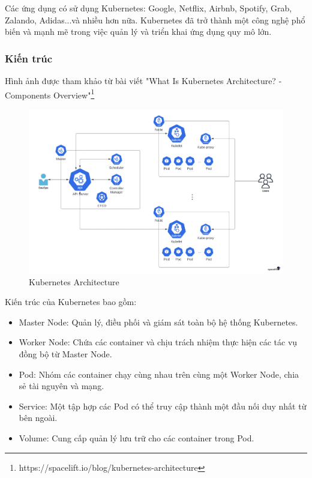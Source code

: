 \noindent Các ứng dụng có sử dụng Kubernetes: Google, Netflix, Airbnb, Spotify, Grab, Zalando, Adidas...và nhiều hơn nữa. Kubernetes đã trở thành một công nghệ phổ biến và mạnh mẽ trong việc quản lý và triển khai ứng dụng quy mô lớn.
\subsubsection{Kiến trúc}
\noindent Hình ảnh được tham khảo từ bài viết "What Is Kubernetes Architecture? - Components Overview"\footnote{https://spacelift.io/blog/kubernetes-architecture}
 \begin{figure}[H]
    \begin{center}
    \includegraphics[scale = 0.2]{images/phat/kubernetes_architecture.jpg}
    \vspace*{7mm}
    \caption{Kubernetes Architecture }
    \end{center}
    \label{}
\end{figure}
\noindent Kiến trúc của Kubernetes bao gồm:
\begin{itemize}
    \item Master Node: Quản lý, điều phối và giám sát toàn bộ hệ thống Kubernetes.
    \item Worker Node: Chứa các container và chịu trách nhiệm thực hiện các tác vụ đồng bộ từ Master Node.
    \item Pod: Nhóm các container chạy cùng nhau trên cùng một Worker Node, chia sẻ tài nguyên và mạng.
    \item Service: Một tập hợp các Pod có thể truy cập thành một đầu nối duy nhất từ bên ngoài.
    \item Volume: Cung cấp quản lý lưu trữ cho các container trong Pod.
\end{itemize}
